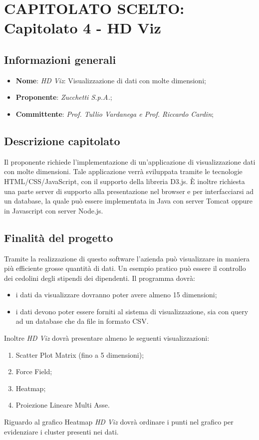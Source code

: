 \section{CAPITOLATO SCELTO: Capitolato 4 - HD Viz}
\subsection{Informazioni generali}
\begin{itemize}
    \item \textbf{Nome}: \emph{HD Viz}: Visualizzazione di dati con molte dimensioni;
    \item \textbf{Proponente}: \emph{Zucchetti S.p.A.};
    \item \textbf{Committente}: \emph{Prof. Tullio Vardanega e Prof. Riccardo Cardin};
\end{itemize}
\subsection{Descrizione capitolato}
Il proponente richiede l'implementazione di un'applicazione di visualizzazione dati con molte dimensioni. Tale applicazione verrà sviluppata tramite le tecnologie HTML/CSS/JavaScript, con il supporto della libreria D3.js. È inoltre richiesta una parte server di supporto alla presentazione nel browser e per interfacciarsi ad un  database, la quale può essere implementata in Java con server Tomcat oppure in Javascript con server Node.js.
\subsection{Finalità del progetto}
Tramite la realizzazione di questo software l'azienda può visualizzare in maniera più efficiente grosse quantità di dati. Un esempio pratico può essere il controllo dei cedolini degli stipendi dei dipendenti. Il programma dovrà:
\begin{itemize}
    \item i dati da visualizzare dovranno poter avere almeno 15 dimensioni;
    \item i dati devono poter essere forniti al sistema di visualizzazione, sia con query ad un database che da file in formato CSV.
\end{itemize}
Inoltre \emph{HD Viz} dovrà presentare almeno le seguenti visualizzazioni:
\begin{enumerate}
	\item Scatter Plot Matrix (fino a 5 dimensioni);
	\item Force Field;
	\item Heatmap;
	\item Proiezione Lineare Multi Asse.
\end{enumerate}
Riguardo al grafico Heatmap  \emph{HD Viz} dovrà ordinare i punti nel grafico per evidenziare i cluster presenti nei dati.
